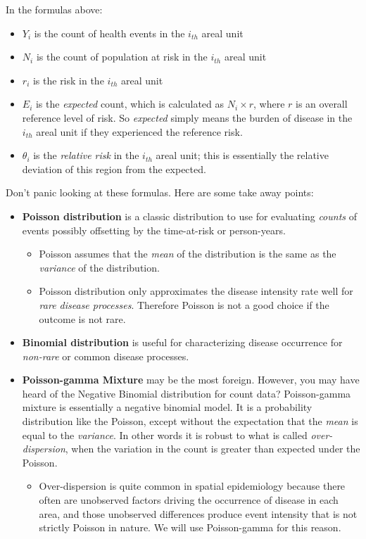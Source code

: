 \documentclass[
]{book}
\providecommand{\tightlist}{%
  \setlength{\itemsep}{0pt}\setlength{\parskip}{0pt}}
\begin{document}
In the formulas above:

\begin{itemize}
\tightlist
\item
  \(Y_i\) is the count of health events in the \(i_{th}\) areal unit
\item
  \(N_i\) is the count of population at risk in the \(i_{th}\) areal unit
\item
  \(r_i\) is the risk in the \(i_{th}\) areal unit
\item
  \(E_i\) is the \emph{expected} count, which is calculated as \(N_i\times r\), where \(r\) is an overall reference level of risk. So \emph{expected} simply means the burden of disease in the \(i_{th}\) areal unit if they experienced the reference risk.
\item
  \(\theta_i\) is the \emph{relative risk} in the \(i_{th}\) areal unit; this is essentially the relative deviation of this region from the expected.
\end{itemize}

Don't panic looking at these formulas. Here are some take away points:

\begin{itemize}
\tightlist
\item
  \textbf{Poisson distribution} is a classic distribution to use for evaluating \emph{counts} of events possibly offsetting by the time-at-risk or person-years.

  \begin{itemize}
  \tightlist
  \item
    Poisson assumes that the \emph{mean} of the distribution is the same as the \emph{variance} of the distribution.
  \item
    Poisson distribution only approximates the disease intensity rate well for \emph{rare disease processes}. Therefore Poisson is not a good choice if the outcome is not rare.
  \end{itemize}
\item
  \textbf{Binomial distribution} is useful for characterizing disease occurrence for \emph{non-rare} or common disease processes.
\item
  \textbf{Poisson-gamma Mixture} may be the most foreign. However, you may have heard of the Negative Binomial distribution for count data? Poisson-gamma mixture is essentially a negative binomial model. It is a probability distribution like the Poisson, except without the expectation that the \emph{mean} is equal to the \emph{variance}. In other words it is robust to what is called \emph{over-dispersion}, when the variation in the count is greater than expected under the Poisson.

  \begin{itemize}
  \tightlist
  \item
    Over-dispersion is quite common in spatial epidemiology because there often are unobserved factors driving the occurrence of disease in each area, and those unobserved differences produce event intensity that is not strictly Poisson in nature. We will use Poisson-gamma for this reason.
  \end{itemize}
\end{itemize}
\end{document}
